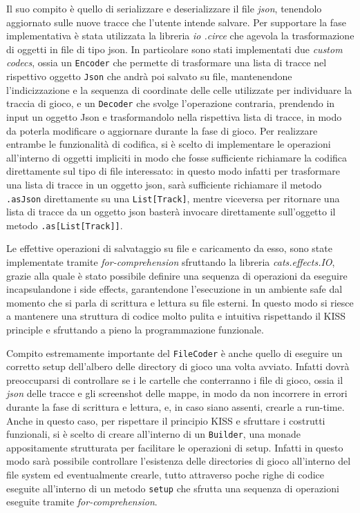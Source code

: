 Il suo compito è quello di serializzare e deserializzare il file \textit{json}, tenendolo aggiornato sulle nuove
tracce che l'utente intende salvare. Per supportare la fase implementativa è stata utilizzata la libreria \textit{io
.circe} che agevola la trasformazione di oggetti in file di tipo json. In particolare sono stati implementati due
\textit{custom codecs}, ossia un \texttt{Encoder} che permette di trasformare una lista di tracce nel rispettivo
oggetto \texttt{Json} che andrà poi salvato su file, mantenendone l'indicizzazione e la sequenza di coordinate delle
celle utilizzate per individuare la traccia di gioco, e un \texttt{Decoder} che svolge l'operazione contraria,
prendendo in input un oggetto Json e trasformandolo nella rispettiva lista di tracce, in modo da poterla modificare o
aggiornare durante la fase di gioco. Per realizzare entrambe le funzionalità di codifica, si è scelto di implementare
le operazioni all'interno di oggetti impliciti in modo che fosse sufficiente richiamare la codifica direttamente sul
tipo di file interessato: in questo modo infatti per trasformare una lista di tracce in un oggetto json, sarà
sufficiente richiamare il metodo \texttt{.asJson} direttamente su una \texttt{List[Track]}, mentre viceversa per
ritornare una lista di tracce da un oggetto json basterà invocare direttamente sull'oggetto il metodo \texttt{.as[List[Track]]}.



Le effettive operazioni di salvataggio su file e caricamento da esso, sono state implementate tramite
\textit{for-comprehension} sfruttando la libreria \textit{cats.effects.IO}, grazie alla quale è stato possibile
definire una sequenza di operazioni da eseguire incapsulandone i side effects, garantendone l'esecuzione in un
ambiente safe dal momento che si parla di scrittura e lettura su file esterni. In questo modo si riesce a mantenere
una struttura di codice molto pulita e intuitiva rispettando il KISS principle e sfruttando a pieno la programmazione
funzionale.

Compito estremamente importante del \texttt{FileCoder} è anche quello di eseguire un corretto setup dell'albero delle
directory di gioco una volta avviato. Infatti dovrà preoccuparsi di controllare se i le cartelle che conterranno i
file di gioco, ossia il \textit{json} delle tracce e gli screenshot delle mappe, in modo da non incorrere in errori
durante la fase di scrittura e lettura, e, in caso siano assenti, crearle a run-time. Anche in questo caso, per
rispettare il principio KISS e sfruttare i costrutti funzionali, si è scelto di creare all'interno di un
\texttt{Builder}, una monade appositamente strutturata per facilitare le operazioni di setup. Infatti in questo modo
sarà possibile controllare l'esistenza delle directories di gioco all'interno del file system ed eventualmente
crearle, tutto attraverso poche righe di codice eseguite all'interno di un metodo \texttt{setup} che sfrutta una
sequenza di operazioni eseguite tramite \textit{for-comprehension}.

